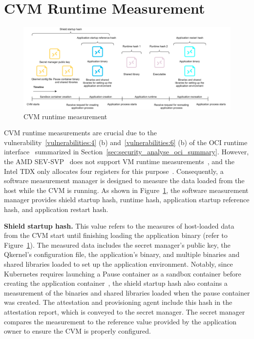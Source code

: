 \section{\acrshort{CVM} Runtime Measurement}
\label{sec:Enclave_Runtime_Measurement}
\begin{figure}[!htb]
    \centering
    \includegraphics[width=1\textwidth]{images/soft_ware_manager_meausrment.png}
    \caption[\acrshort{CVM} runtime measurement]{\acrshort{CVM} runtime measurement}
    \label{fig:soft_ware_manager_meausrment}
\end{figure}
\acrshort{CVM} runtime measurements are crucial due to the vulnerability~\ref{vulnerabilities:4} (b) and~\ref{vulnerabilities:6} (b) of the  OCI runtime interface~\cite*{oci-runtime-spec} summarized in Section~\ref{sec:security_analyse_oci_summary}. However, the AMD SEV-SVP~\cite*{SEV_SNP_white_book} 
does not support VM runtime measurements~\cite*{snp_firmware}, and the Intel TDX only allocates four registers for this purpose~\cite*{Intel_tdx_whitepaper}. Consequently, a software measurement 
manager is designed to measure the data loaded from the host while the \acrshort{CVM} is running. As shown in Figure~\ref{fig:soft_ware_manager_meausrment}, the software measurement manager provides shield startup hash, runtime hash, application startup reference hash, and application restart hash.

\textbf{Shield startup hash.} This value refers to the measures of host-loaded data from the \acrshort{CVM} start until finishing loading the application binary (refer to Figure~\ref{fig:soft_ware_manager_meausrment}). The measured data includes the secret manager's public key, the Qkernel's configuration file, the application's binary, and multiple binaries and 
shared libraries loaded to set up the application environment. Notably, since Kubernetes requires launching a Pause container as a sandbox container before creating the application container~\cite*{cri_plugin_arch}, the shield startup hash also contains a measurement of the binaries and shared libraries loaded when the pause container was created. The attestation 
and provisioning agent include this hash in the attestation report, which is conveyed to the secret manager. The secret manager compares the measurement to the reference value provided by the application owner to ensure the \acrshort{CVM} is properly configured.


